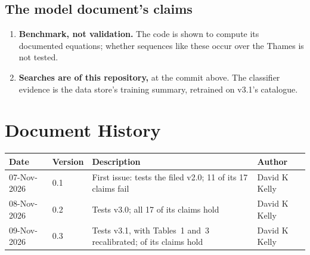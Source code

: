 \documentclass[11pt,a4paper]{article}
\renewcommand{\mkmhistorypage}[1]{%
    \section{Document History}
    \begin{table}[ht]
        \centering
        \begin{tabular}{l|l|p{9cm}|l}
            \textbf{Date} & \textbf{Version} & \textbf{Description} & \textbf{Author} \\
            \hline
            #1
        \end{tabular}
    \end{table}
}
\begin{document}
\mkmvalidation



\subsection{The model document's claims}


\mkmlimitations

\begin{enumerate}[leftmargin=*]
\item \textbf{Benchmark, not validation.} The code is shown to compute its documented
  equations; whether sequences like these occur over the Thames is not tested.
\item \textbf{Searches are of this repository,} at the commit above. The classifier
  evidence is the data store's training summary, retrained on v3.1's catalogue.
\end{enumerate}

\mkmhistorypage{07-Nov-2026 & 0.1 & First issue: tests the filed v2.0; 11 of its 17 claims fail & David K Kelly \\
08-Nov-2026 & 0.2 & Tests v3.0; all 17 of its claims hold & David K Kelly \\
09-Nov-2026 & 0.3 & Tests v3.1, with Tables~1 and~3 recalibrated; \bmClaimsMet{} of its \bmClaims{} claims hold & David K Kelly \\}
\end{document}
